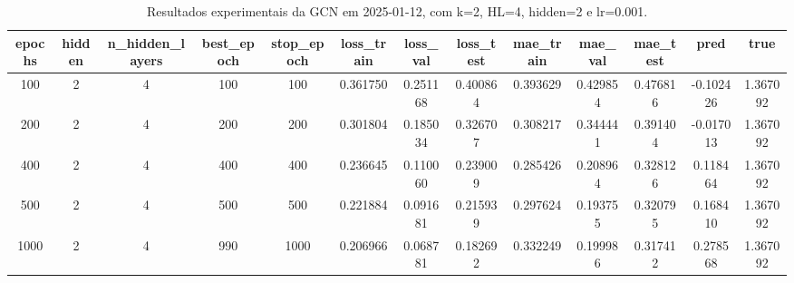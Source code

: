 \begin{table}[h]
\centering
\caption{Resultados experimentais da GCN em 2025-01-12, com k=2, HL=4, hidden=2 e lr=0.001.}
\label{tab:gcn_results_k2_hl4_h2_d20250112}
\begin{tabular}{ccccccccccccc}
\toprule
epochs & hidden & n\_hidden\_layers & best\_epoch & stop\_epoch & loss\_train & loss\_val & loss\_test & mae\_train & mae\_val & mae\_test & pred & true \\
\midrule
100 & 2 & 4 & 100 & 100 & 0.361750 & 0.251168 & 0.400864 & 0.393629 & 0.429854 & 0.476816 & -0.102426 & 1.367092 \\
200 & 2 & 4 & 200 & 200 & 0.301804 & 0.185034 & 0.326707 & 0.308217 & 0.344441 & 0.391404 & -0.017013 & 1.367092 \\
400 & 2 & 4 & 400 & 400 & 0.236645 & 0.110060 & 0.239009 & 0.285426 & 0.208964 & 0.328126 & 0.118464 & 1.367092 \\
500 & 2 & 4 & 500 & 500 & 0.221884 & 0.091681 & 0.215939 & 0.297624 & 0.193755 & 0.320795 & 0.168410 & 1.367092 \\
1000 & 2 & 4 & 990 & 1000 & 0.206966 & 0.068781 & 0.182692 & 0.332249 & 0.199986 & 0.317412 & 0.278568 & 1.367092 \\
\bottomrule
\end{tabular}
\end{table}
